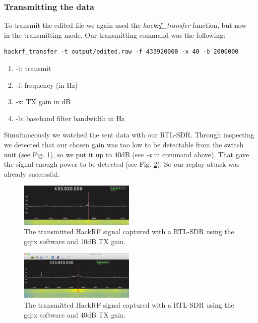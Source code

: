 \documentclass[conference]{IEEEtran}
\begin{document}
\subsubsection{Transmitting the data}
To transmit the edited file we again used the \textit{hackrf\_transfer} function, but now in the transmitting mode.  Our transmitting command was the following:
\begin{lstlisting}
hackrf_transfer -t output/edited.raw -f 433920000 -x 40 -b 2000000
\end{lstlisting}
\begin{enumerate}
	\item -t: transmit
	\item -f: frequency (in Hz)
	\item -x: TX gain in dB
	\item -b: baseband filter bandwidth in Hz
\end{enumerate}
Simultaneously we watched the sent data with our RTL-SDR. Through inspecting we detected that our chosen gain was too low to be detectable from the switch unit (see Fig. \ref{fig:hackrf_gqrx_g10}), so we put it up to 40dB (see  \textit{-x} in command above). That gave the signal enough power to be detected (see Fig. \ref{fig:hackrf_gqrx_g40}). So our replay attack was already successful.

\begin{figure}[H]
	\centering
	\includegraphics[width=0.5\textwidth]{gqrx_hackrf_transmission_gain10}
	\caption{The transmitted HackRF signal captured with a RTL-SDR using the gqrx software and 10dB TX gain.}
	\label{fig:hackrf_gqrx_g10}
\end{figure}

\begin{figure}[H]
	\centering
	\includegraphics[width=0.5\textwidth]{gqrx_hackrf_transmission}
	\caption{The transmitted HackRF signal captured with a RTL-SDR using the gqrx software and 40dB TX gain.}
	\label{fig:hackrf_gqrx_g40}
\end{figure}
\bigbreak
\end{document}
